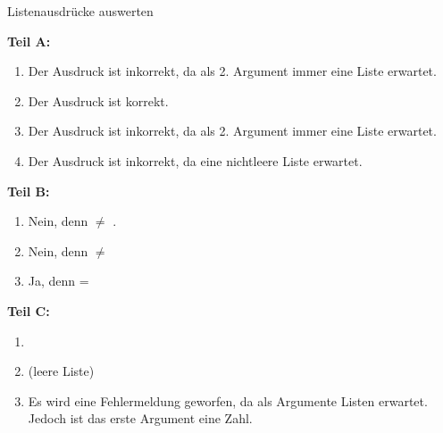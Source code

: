 \documentclass{../tuda-exercise}
\begin{document}
\begin{task}[credit=\stars{1}{3}]{Listenausdrücke auswerten}
    \begin{solution}
    {\large\textbf{Teil A:}}
      \begin{enumerate}
        \item Der Ausdruck ist inkorrekt, da  als 2. Argument immer eine Liste
        erwartet.
        \item Der Ausdruck ist korrekt.
        \item Der Ausdruck ist inkorrekt, da  als 2. Argument immer eine Liste
        erwartet.
        \item Der Ausdruck ist inkorrekt, da  eine nichtleere Liste erwartet.
      \end{enumerate}
      {\large\textbf{Teil B:}}
      \begin{enumerate}
        \item Nein, denn  \(\neq\) 
        \code{\textcolor{keywordcolor}{'()})}.
        \item Nein, denn  \code{\textcolor{stringcolor}{"'(list )"'}}
        \inlineracket{))} \(\neq\)  \code{\textcolor{stringcolor}{"'list"'}
        \textcolor{keywordcolor}{'()})}
        \item Ja, denn  \code{\textcolor{stringcolor}{"'*"'}} 
        \code{\textcolor{stringcolor}{"'="'}}  = 
        \code{\textcolor{stringcolor}{"'*"'}} 
        \code{\textcolor{stringcolor}{"'="'}} 
      \end{enumerate}
      {\large\textbf{Teil C:}}
      \begin{enumerate}
        \item {}
        \item \code{\textcolor{keywordcolor}{'()}} (leere Liste)
        \item Es wird eine Fehlermeldung geworfen, da  als Argumente Listen
        erwartet. Jedoch ist
        das erste Argument eine Zahl.
      \end{enumerate}
    \end{solution}
  \end{task}
\end{document}
